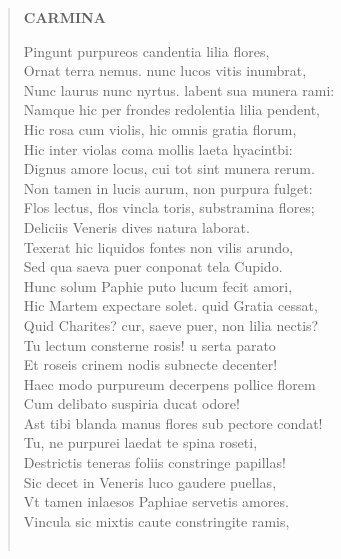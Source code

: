 \documentclass[11pt, a4paper]{report}
\begin{document}
\begin{verse}
     \marginpar{[204]} \begin{center} \textbf{CARMINA} \end{center}Pingunt purpureos candentia lilia flores, \\ Ornat terra nemus. nunc lucos vitis inumbrat, \\ Nunc laurus nunc nyrtus. labent sua munera rami: \\ Namque hic per frondes redolentia lilia pendent, \\ Hic rosa cum violis, hic omnis gratia florum, \\ Hic inter violas coma mollis laeta hyacintbi: \\ Dignus amore locus, cui tot sint munera rerum. \\ Non tamen in lucis aurum, non purpura fulget: \\ Flos lectus, flos vincla toris, substramina flores; \\ Deliciis Veneris dives natura laborat. \\ Texerat hic liquidos fontes non vilis arundo, \\ Sed qua saeva puer conponat tela Cupido. \\ Hunc solum Paphie puto lucum fecit amori, \\ Hic Martem expectare solet. quid Gratia cessat, \\ Quid Charites? cur, saeve puer, non lilia nectis? \\ Tu lectum consterne rosis! u serta parato \\ Et roseis crinem nodis subnecte decenter! \\ Haec modo purpureum decerpens pollice florem \\ Cum delibato suspiria ducat odore! \\ Ast tibi blanda manus  \lbrack flores \rbrack  sub pectore condat! \\ Tu, ne purpurei laedat te spina roseti, \\ Destrictis teneras foliis constringe papillas! \\ Sic decet in Veneris luco gaudere puellas, \\ Vt tamen inlaesos Paphiae servetis amores. \\ Vincula sic mixtis caute constringite ramis, \\ 
        ﻿\pagebreak 

\end{verse}
\end{document}
